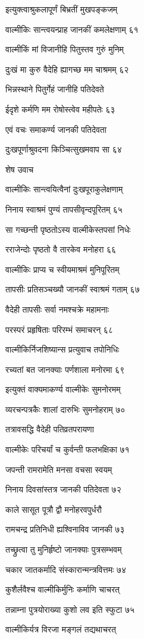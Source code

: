 इत्युक्त्वाश्रुकलापूर्णं बिभ्रतीं मुखपङ्कजम्

वाल्मीकिः सान्त्वयन्प्राह जानकीं कमलेक्षणाम् ६१

वाल्मीकिं मां विजानीहि पितुस्तव गुरुं मुनिम्

दुःखं मा कुरु वैदेहि ह्यागच्छ मम चाश्रमम् ६२

भिन्नस्थाने पितुर्गेहं जानीहि पतिदेवते

ईदृशे कर्मणि मम रोषोस्त्वेव महीपतेः ६३

एवं वचः समाकर्ण्य जानकी पतिदेवता

दुःखपूर्णाश्रुवदना किञ्चित्सुखमवाप सा ६४

शेष उवाच

वाल्मीकिः सान्त्वयित्वैनां दुःखपूराकुलेक्षणाम्

निनाय स्वाश्रमं पुण्यं तापसीवृन्दपूरितम् ६५

सा गच्छन्ती पृष्ठतोऽस्य वाल्मीकेस्तपसां निधेः

रराजेन्दोः पृष्ठतो वै तारकेव मनोहरा ६६

वाल्मीकिः प्राप्य च स्वीयमाश्रमं मुनिपूरितम्

तापसीः प्रतिसञ्चख्यौ जानकीं स्वाश्रमं गताम् ६७

वैदेही तापसीः सर्वा नमश्चक्रे महामनाः

परस्परं प्रहृषिताः परिरम्भं समाचरन् ६८

वाल्मीकिर्निजशिष्यान्स प्रत्युवाच तपोनिधिः

रच्यतां बत जानक्याः पर्णशाला मनोरमा ६९

इत्युक्तं वाक्यमाकर्ण्य वाल्मीकेः सुमनोरमम्

व्यरचन्पत्रकैः शालां दारुभिः सुमनोहराम् ७०

तत्रावसद्धि वैदेही पतिव्रतपरायणा

वाल्मीकेः परिचर्यां च कुर्वन्ती फलभक्षिका ७१

जपन्ती रामरामेति मनसा वचसा स्वयम्

निनाय दिवसांस्तत्र जानकी पतिदेवता ७२

काले सासूत पूत्रौ द्वौ मनोहरवपुर्धरौ

रामचन्द्र प्रतिनिधी ह्यश्विनाविव जानकी ७३

तच्छ्रुत्वा तु मुनिर्हृष्टो जानक्याः पुत्रसम्भवम्

चकार जातकर्मादि संस्कारान्मन्त्रवित्तमः ७४

कुशैर्लवैश्च वाल्मीकिर्मुनिः कर्माणि चाचरत्

तन्नाम्ना पुत्रयोराख्या कुशो लव इति स्फुटा ७५

वाल्मीकिर्यत्र विरजा मङ्गलं तद्यथाचरत्

